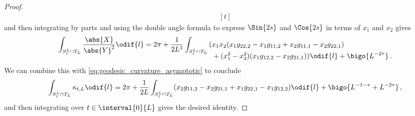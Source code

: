 \documentclass[titlepage,numbers=noenddot,oneside,%
cleardoublepage=empty,paper=a4,fontsize=11pt,%
english,%
]{scrartcl}
\newcommand*{\mathcomma}{\,,}
\newcommand*{\mathfullstop}{\,.}
\begin{document}
\begin{proof}
\begin{equation*}
\begin{aligned}[t]
        \end{aligned}
    \end{equation*}
    and then integrating by parts and using the double angle formula to express \( \Sin{2s} \) and \( \Cos{2s} \) in terms of \( x_1 \) and \( x_2 \) gives
    \begin{equation*}
        \int_{S_t^L\cap T_L}\frac{\abs{X}}{\abs{Y}^2}\odif{l}=2\pi+\frac{1}{2L^3}\int_{S_t^L\cap T_L}\begin{aligned}[t]
            (&x_1x_2(x_1 g_{22,2}-x_1 g_{11,2}+x_2 g_{11,1}-x_2 g_{22,1})\\
            &+(x_1^2-x_2^2)(x_1 g_{12,2}-x_2 g_{21,1}))\odif{l}+\bigo{L^{-2\tau}}\mathfullstop
        \end{aligned}
    \end{equation*}
    We can combine this with \cref{eq:geodesic_curvature_asymptotic} to conclude
    \begin{equation*}
        \int_{S_t^L \cap T_L}\kappa_{t,L}\odif{l}=2\pi+\frac{1}{2L}\int_{S_t^L \cap T_L}(x_2 g_{11,2}-x_2 g_{21,1}+x_1 g_{22,1}-x_1 g_{12,2})\odif{l}+\bigo{L^{-1-\tau}+L^{-2\tau}}\mathcomma
    \end{equation*}
    and then integrating over \( t\in \interval{0}{L} \) gives the desired identity.
\end{proof}
\end{document}
